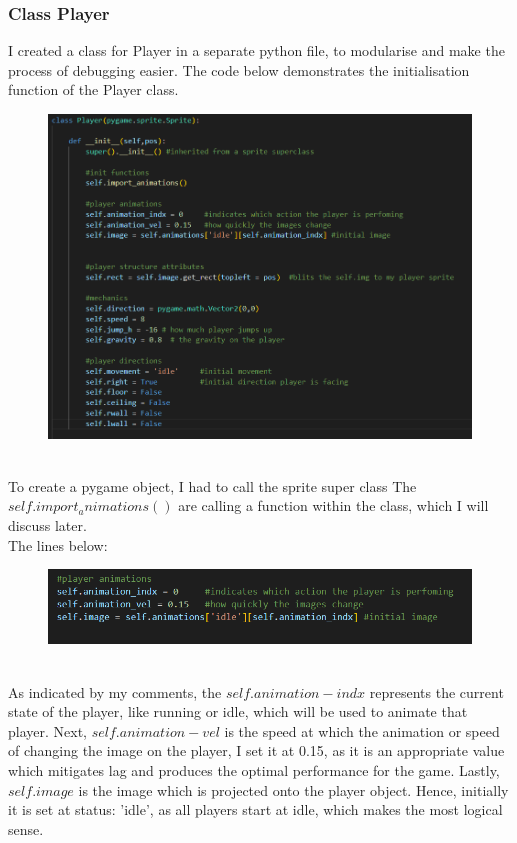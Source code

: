 \documentclass[12pt]{article}
\begin{document}
\subsubsection{Class Player}
I created a class for Player in a separate python file, to modularise and make the process of debugging easier. The code below demonstrates the initialisation function of the Player class.
\begin{figure}[H]
    \includegraphics[width = 15cm]{player class/POne.PNG}
    \centering
\end{figure}\\
To create a pygame object, I had to call the sprite super class
The $self.import_animations()$ are calling a function within the class, which I will discuss later.  \\

The lines below:\\
\begin{figure}[H]
    \includegraphics[width = 15cm]{player class/initPlayer1.PNG}
    \centering
\end{figure}\\
As indicated by my comments, the $self.animation-indx$ represents the current state of the player, like running or idle, which will be used to animate that player. Next, $self.animation-vel$ is the speed at which the animation or speed of changing the image on the player, I set it at 0.15, as it is an appropriate value which mitigates lag and produces the optimal performance for the game. Lastly, $self.image$ is the image which is projected onto the player object. Hence, initially it is set at status: 'idle', as all players start at idle, which makes the most logical sense. 
\newpage
\end{document}
